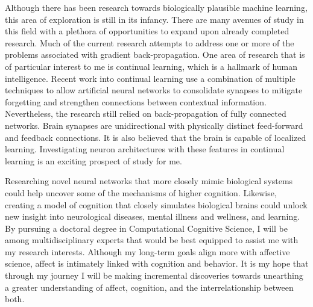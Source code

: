 \documentclass[12pt]{article}
\begin{document}
Although there has been research towards biologically plausible machine
learning, this area of exploration is still in its infancy.  There are many
avenues of study in this field with a plethora of opportunities to expand upon
already completed research.  Much of the current research attempts to address
one or more of the problems associated with gradient back-propagation.
One
area of research that is of particular interest to me is continual learning, which is a
hallmark of human intelligence.  Recent work into continual learning use a
combination of multiple techniques to allow artificial neural networks to
consolidate synapses to mitigate forgetting and strengthen connections between
contextual information.  Nevertheless, the research still relied on
back-propagation of fully connected networks.  Brain synapses are unidirectional
with physically distinct feed-forward and feedback connections. It is also
believed that the brain is capable of localized learning. Investigating neuron
architectures with these features in continual learning is an exciting prospect
of study for me.

Researching novel neural networks that more closely mimic biological systems could
help uncover some of the mechanisms of higher cognition.  Likewise, creating a model of
cognition that closely simulates biological brains could unlock new insight into
neurological diseases, mental illness and wellness, and learning.  By pursuing a
doctoral degree in Computational Cognitive Science, I will be among
multidisciplinary experts that would be best equipped to assist me with my
research interests.  Although my long-term goals align more with affective
science, affect is intimately linked with cognition and behavior.  It is my hope
that through my journey I will be making incremental discoveries towards
unearthing a greater understanding of affect, cognition, and the
interrelationship between both.
\end{document}

